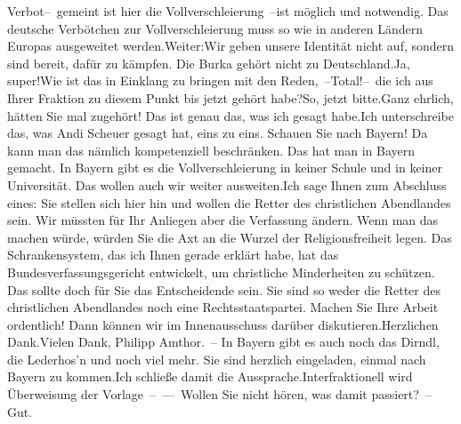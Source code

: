 \documentclass{article}
\begin{document}
Verbot– gemeint ist hier die Vollverschleierung –ist möglich und notwendig. Das deutsche Verbötchen zur Vollverschleierung muss so wie in anderen Ländern Europas ausgeweitet werden.Weiter:Wir geben unsere Identität nicht auf, sondern sind bereit, dafür zu kämpfen. Die Burka gehört nicht zu Deutschland.Ja, super!Wie ist das in Einklang zu bringen mit den Reden, –Total!– die ich aus Ihrer Fraktion zu diesem Punkt bis jetzt gehört habe?So, jetzt bitte.Ganz ehrlich, hätten Sie mal zugehört! Das ist genau das, was ich gesagt habe.Ich unterschreibe das, was Andi Scheuer gesagt hat, eins zu eins. Schauen Sie nach Bayern! Da kann man das nämlich kompetenziell beschränken. Das hat man in Bayern gemacht. In Bayern gibt es die Vollverschleierung in keiner Schule und in keiner Universität. Das wollen auch wir weiter ausweiten.Ich sage Ihnen zum Abschluss eines: Sie stellen sich hier hin und wollen die Retter des christlichen Abendlandes sein. Wir müssten für Ihr Anliegen aber die Verfassung ändern. Wenn man das machen würde, würden Sie die Axt an die Wurzel der Religionsfreiheit legen. Das Schrankensystem, das ich Ihnen gerade erklärt habe, hat das Bundesverfassungsgericht entwickelt, um christliche Minderheiten zu schützen. Das sollte doch für Sie das Entscheidende sein. Sie sind so weder die Retter des christlichen Abendlandes noch eine Rechtsstaatspartei. Machen Sie Ihre Arbeit ordentlich! Dann können wir im Innenausschuss darüber diskutieren.Herzlichen Dank.Vielen Dank, Philipp Amthor. – In Bayern gibt es auch noch das Dirndl, die Lederhos’n und noch viel mehr. Sie sind herzlich eingeladen, einmal nach Bayern zu kommen.Ich schließe damit die Aussprache.Interfraktionell wird Überweisung der Vorlage – –– Wollen Sie nicht hören, was damit passiert? – Gut.
\end{document}
